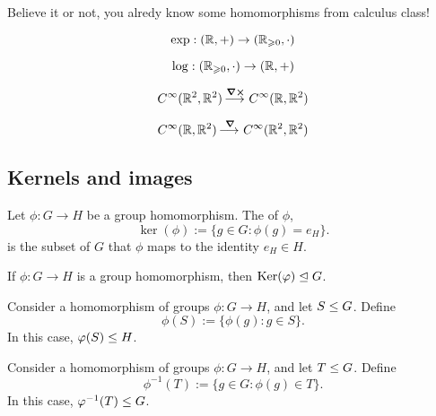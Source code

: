 \documentclass{ximera}
\begin{document}
Believe it or not, you alredy know some homomorphisms from calculus
class!

\[
\exp:(\mathbb R,+) \to (\mathbb R_{\geqslant 0},\cdot)
\]

\[
\log:(\mathbb R_{\geqslant 0},\cdot) \to (\mathbb R,+)
\]

\[
C^\infty(\mathbb R^2,\mathbb R^2) \mathop{\longrightarrow\,}\limits^{\boldsymbol{\nabla\times}} C^\infty(\mathbb R,\mathbb R^2)
\]


\[
C^\infty(\mathbb R,\mathbb R^2) \mathop{\longrightarrow\,}\limits^{\boldsymbol\nabla} C^\infty(\mathbb R^2,\mathbb R^2)
\]








\subsection{Kernels and images}



\begin{definition}
  Let $\phi:G\to H$ be a group homomorphism. The  of
  $\phi$,
  \[
  \ker(\phi) := \{g\in G: \phi(g) = e_H\}.
  \]
  is the subset of $G$ that $\phi$ maps to the identity $e_H\in H$.
\end{definition}


\begin{lemma}\label{L:kerN}
  If $\phi:G\to H$ is a group homomorphism, then $\mathop{\mathrm{Ker}}\nolimits(\varphi)\trianglelefteq G$.
\end{lemma}

\begin{lemma}\label{L:hps}
  Consider a homomorphism of groups $\phi:G\to H$, and let $S\leq
  G$. Define
  \[
  \phi(S) := \{\phi(g): g\in S\}.
  \]
  In this case, $\varphi(S) \leq H$.
\end{lemma}



\begin{lemma}\label{L:pps}
  Consider a homomorphism of groups $\phi:G\to H$, and let $T\leq
  G$. Define
  \[
  \phi^{-1}(T) := \{g\in G: \phi(g)\in T\}.
  \]
  In this case, $\varphi^{-1}(T) \leq G$.
\end{lemma}
\end{document}
